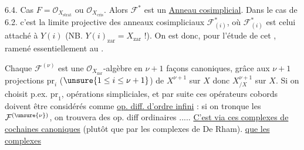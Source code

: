 6.4. Cas $F=\mathcal O_{X_{\mathrm{strat}}}$ ou $\mathcal O_{X_{\mathrm{cris}}}$. Alors $\mathcal F^*$ est un \uline{Anneau cosimplicial}. 
Dans le cas de 6.2. c'est la limite projective des anneaux cosimpliciaux $\mathcal F_{(i)}^*$, où $\mathcal F_{(i)}^*$ est celui attaché à $Y(i)$ (NB. $Y(i)_{\mathrm{zar}}=X_{\mathrm{zar}}$ !). On est donc, pour l'étude de cet , ramené essentiellement au  .

Chaque $\mathcal F^{(\nu)}$ est une $\mathcal O_{X_{\mathrm{zar}}}$-algèbre en $\nu+1$ façons canoniques, grâce aux $\nu+1$ projections $\mathrm{pr}_i$ ($\unsure{1\le i\le\nu+1}$) de $X^{\nu+1}$ sur $X$ donc $X^{\nu+1}_{/X}$ sur $X$. Si on choisit p.ex. $\mathrm{pr}_1$,  opérations simpliciales, et par suite ces opérateurs cobords doivent être considérés comme \uline{op. diff. d'ordre infini} : si on tronque les $\mathcal F^{(\unsure{\nu})}$, on trouvera des op. diff ordinaires ..... \uline{C'est via ces complexes de cochaines canoniques} (plutôt que par les complexes de De Rham). \uline{que les complexes}
